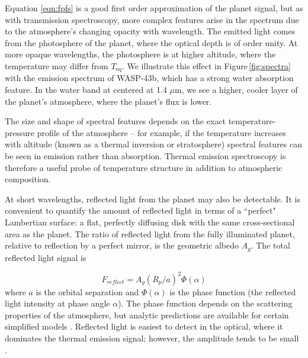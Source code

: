 \documentclass[graybox,natbib,nosecnum]{svmult}
\newcommand{\hbindex}[1]{\hl{#1}\index{#1}}  %
\begin{document}
Equation \ref{eqn:fpfs} is a good first order approximation of the planet signal, but as with transmission spectroscopy, more complex features arise in the spectrum due to the atmosphere's changing opacity with wavelength. The emitted light comes from the photosphere of the planet, where the optical depth is of order unity. At more opaque wavelengths, the photosphere is at higher altitude, where the temperature may differ from $T_\mathrm{eq}$. We illustrate this effect in Figure\,\ref{fig:spectra} with the emission spectrum of WASP-43b, which has a strong water absorption feature. In the water band at centered at 1.4 $\mu$m, we see a higher, cooler layer of the planet's atmosphere, where the planet's flux is lower.

The size and shape of spectral features depends on the exact temperature-pressure profile of the atmosphere -- for example, if the temperature increases with altitude (known as a thermal inversion or stratosphere) spectral features can be seen in emission rather than absorption. Thermal emission spectroscopy is therefore a useful probe of temperature structure in addition to atmospheric composition.


At short wavelengths, reflected light from the planet may also be detectable. It is convenient to quantify the amount of reflected light in terms of a ``perfect" Lambertian surface: a flat, perfectly diffusing disk with the same cross-sectional area as the planet. The ratio of reflected light from the fully illuminated planet, relative to reflection by a perfect mirror, is the geometric albedo $A_g$. The total reflected light signal is

\begin{equation}
F_{reflect} = A_g(R_p/a)^2 \Phi(\alpha)
\end{equation}
where $a$ is the orbital separation and $\Phi(\alpha)$ is the phase function (the reflected light intensity at phase angle $\alpha$). The phase function depends on the scattering properties of the atmosphere, but analytic predictions are available for certain simplified models \citep[e.g.][]{madhu12}.  Reflected light is easiest to detect in the optical, where it dominates the thermal emission signal; however, the amplitude tends to be small \citep[typically less than 100 ppm;][]{angerhausen15}.
\end{document}

